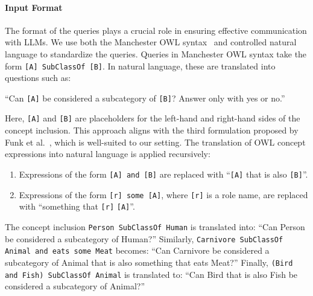\paragraph{Input Format}
\label{par:input-format}
%
The format of the queries plays a crucial role in ensuring effective communication with \glspl{LLM}.
%
We use both the Manchester \gls{OWL} syntax~\cite{DBLP:conf/owled/HorridgeDGRSW06} and controlled natural language to standardize the queries.
%
Queries in Manchester \gls{OWL} syntax take the form \texttt{[A] SubClassOf [B]}.
%
In natural language, these are translated into questions such as:
%
\begin{center}
    ``Can \texttt{[A]} be considered a subcategory of \texttt{[B]}? Answer only with yes or no.''
\end{center}
%
Here, \texttt{[A]} and \texttt{[B]} are placeholders for the left-hand and right-hand sides of the concept inclusion.
%
This approach aligns with the third formulation proposed by Funk et al.~\cite{funk2023ontology}, which is well-suited to our setting.
%
The translation of \gls{OWL} concept expressions into natural language is applied recursively:
%
\begin{enumerate}
    \item Expressions of the form \texttt{[A] and [B]} are replaced with ``\texttt{[A]} that is also \texttt{[B]}''.
    \item Expressions of the form \texttt{[r] some [A]}, where \texttt{[r]} is a role name, are replaced with ``something that \texttt{[r]} \texttt{[A]}''.
\end{enumerate}
%
\begin{example}\upshape
    The concept inclusion \texttt{Person SubClassOf Human} is translated into:
    ``Can Person be considered a subcategory of Human?''
    Similarly, \texttt{Carnivore SubClassOf Animal and eats some Meat} becomes:
    ``Can Carnivore be considered a subcategory of Animal that is also something that eats Meat?''
    Finally, \texttt{(Bird and Fish) SubClassOf Animal} is translated to:
    ``Can Bird that is also Fish be considered a subcategory of Animal?''
\end{example}


